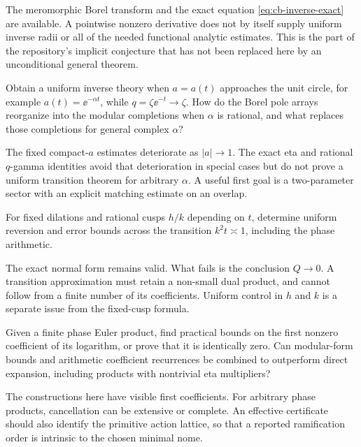 The meromorphic Borel transform and the exact equation
\cref{eq:cb-inverse-exact} are available.
A pointwise nonzero derivative does not by itself supply uniform
inverse radii or all of the needed functional analytic estimates.
This is the part of the repository's implicit conjecture that
has not been replaced here by an unconditional general theorem.

\begin{question}
Obtain a uniform inverse theory when \(a=a(t)\) approaches the
unit circle, for example \(a(t)=\ee^{-\alpha t}\), while
\(q=\zeta\ee^{-t}\to\zeta\).
How do the Borel pole arrays reorganize into the modular
completions when \(\alpha\) is rational, and what replaces those
completions for general complex \(\alpha\)?
\end{question}

The fixed compact-\(a\) estimates deteriorate as \(|a|\to1\).
The exact eta and rational \(q\)-gamma identities avoid that
deterioration in special cases but do not prove a uniform
transition theorem for arbitrary \(\alpha\).
A useful first goal is a two-parameter sector with an explicit
matching estimate on an overlap.

\begin{question}
For fixed dilations and rational cusps \(h/k\) depending on \(t\),
determine uniform reversion and error bounds across the
transition \(k^2t\asymp1\), including the phase arithmetic.
\end{question}

The exact normal form remains valid.
What fails is the conclusion \(Q\to0\).
A transition approximation must retain a non-small dual product,
and cannot follow from a finite number of its coefficients.
Uniform control in \(h\) and \(k\) is a separate issue from
the fixed-cusp formula.

\begin{question}
Given a finite phase Euler product, find practical bounds on
the first nonzero coefficient of its logarithm, or prove that
it is identically zero.
Can modular-form bounds and arithmetic coefficient recurrences
be combined to outperform direct expansion, including products
with nontrivial eta multipliers?
\end{question}

The constructions here have visible first coefficients.
For arbitrary phase products, cancellation can be extensive or
complete.  An effective certificate should also identify the
primitive action lattice, so that a reported ramification
order is intrinsic to the chosen minimal nome.

